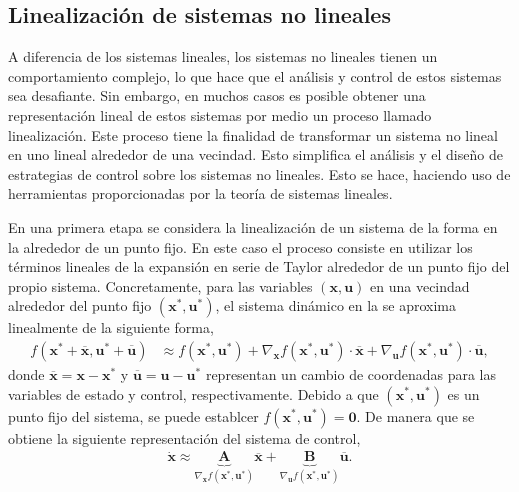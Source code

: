 \subsection{Linealización de sistemas no lineales}
A diferencia de los sistemas lineales, los sistemas no lineales tienen un comportamiento complejo, lo que hace que el análisis y control de estos sistemas sea desafiante. Sin embargo, en muchos casos es posible obtener una representación lineal de estos sistemas por medio un proceso llamado linealización. Este proceso tiene la finalidad de transformar un sistema no lineal en uno lineal alrededor de una vecindad. Esto simplifica el análisis y el diseño de estrategias de control sobre los sistemas no lineales. Esto se hace, haciendo uso de herramientas proporcionadas por la teoría de sistemas lineales. \cite{capella2020clase}

En una primera etapa se considera la linealización de un sistema de la forma en la  alrededor de un punto fijo. En este caso el proceso consiste en utilizar los términos lineales de la expansión en serie de Taylor alrededor de un punto fijo del propio sistema. Concretamente, para las variables  $(\mathbf{x}, \mathbf{u})$ en una vecindad alrededor del punto fijo $(\mathbf{x}^{*}, \mathbf{u}^{*})$, el sistema dinámico en la  se aproxima linealmente de la siguiente forma,
\begin{align}
    f(\mathbf{x}^{*}+ \overline{\mathbf{x}}, \mathbf{u}^{*}+ \overline{\mathbf{u}}) &\approx f(\mathbf{x}^{*}, \mathbf{u}^{*}) + \nabla_{\mathbf{x}} f(\mathbf{x}^{*}, \mathbf{u}^{*})\cdot \overline{\mathbf{x}}+ \nabla_{\mathbf{u}}f(\mathbf{x}^{*}, \mathbf{u}^{*}) \cdot \overline{\mathbf{u}}, 
    \label{eq:taylor_f}
\end{align}
donde $\overline{\mathbf{x}} = \mathbf{x}-\mathbf{x}^{*}$ y  $\overline{\mathbf{u}} = \mathbf{u} - \mathbf{u}^{*}$ representan un cambio de coordenadas para las variables de estado y control, respectivamente. Debido a que $(\mathbf{x}^{*}, \mathbf{u}^{*})$ es un punto fijo del sistema, se puede establcer $f(\mathbf{x}^{*}, \mathbf{u}^{*})= \mathbf{0}$. De manera que se obtiene la siguiente representación del sistema de control,
\begin{align}\label{eq:taylor_linear_control_system}
    \dot{\mathbf{x}}\approx \underbrace{\mathbf{A}}_{\nabla_{\mathbf{x}} f(\mathbf{x}^{*}, \mathbf{u}^{*})} \overline{\mathbf{x}} + \underbrace{\mathbf{B}}_{\nabla_{\mathbf{u}} f(\mathbf{x}^{*}, \mathbf{u}^{*})}\overline{\mathbf{u}}.
\end{align}

